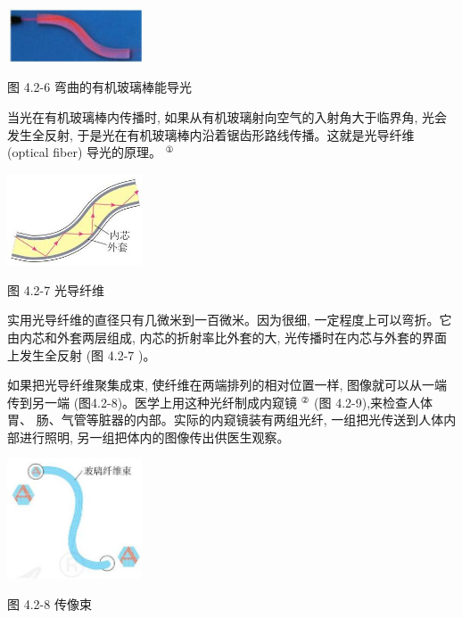\documentclass[10pt]{article}
\begin{document}
\begin{center}
\includegraphics[max width=0.3\textwidth]{images/01910e4c-ebb8-7d2c-8f2f-2375bc1d2d12_98_797960.jpg}
\end{center}

图 4.2-6 弯曲的有机玻璃棒能导光

当光在有机玻璃棒内传播时, 如果从有机玻璃射向空气的入射角大于临界角, 光会发生全反射, 于是光在有机玻璃棒内沿着锯齿形路线传播。这就是光导纤维 (optical fiber) 导光的原理。 \({}^{\text{①}}\)

\begin{center}
\includegraphics[max width=0.3\textwidth]{images/01910e4c-ebb8-7d2c-8f2f-2375bc1d2d12_98_101812.jpg}
\end{center}

图 4.2-7 光导纤维

实用光导纤维的直径只有几微米到一百微米。因为很细, 一定程度上可以弯折。它由内芯和外套两层组成, 内芯的折射率比外套的大, 光传播时在内芯与外套的界面上发生全反射 (图 4.2-7 )。

如果把光导纤维聚集成束, 使纤维在两端排列的相对位置一样, 图像就可以从一端传到另一端 (图4.2-8)。医学上用这种光纤制成内窥镜 \({}^{\text{②}}\) (图 4.2-9),来检查人体胃、 肠、气管等脏器的内部。实际的内窥镜装有两组光纤, 一组把光传送到人体内部进行照明, 另一组把体内的图像传出供医生观察。

\begin{center}
\includegraphics[max width=0.3\textwidth]{images/01910e4c-ebb8-7d2c-8f2f-2375bc1d2d12_98_938520.jpg}
\end{center}

图 4.2-8 传像束
\end{document}
